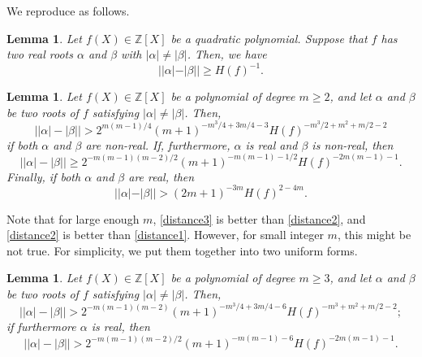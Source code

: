 \documentclass[12pt]{amsart}
\newtheorem{lemma}[theorem]{Lemma}
\theoremstyle{definition}
\theoremstyle{remark}
\numberwithin{equation}{section}
\begin{document}
We reproduce \cite[Lemma 2.4 and Lemma 2.5]{DS2} as follows.

\begin{lemma}
\label{quadratic}
Let $f(X)\in{{\mathbb Z}}[X]$ be a quadratic polynomial. Suppose that $f$ has two real roots ${\alpha}$ and ${\beta}$ with $|{\alpha}| \ne |{\beta}|$. Then, we have
$$
||{\alpha}|-|{\beta}|| \ge H(f)^{-1}.
$$
\end{lemma}

\begin{lemma}
Let $f(X)\in{{\mathbb Z}}[X]$ be a polynomial of degree $m\ge 2$, and let $\alpha$ and $\beta$ be two roots of $f$ satisfying $|\alpha| \ne |\beta|$. Then,
\begin{equation}
\label{distance1}
\left||\alpha|-|\beta|\right|>
2^{m(m-1)/4}(m+1)^{-m^3/4+3m/4-3}H(f)^{-m^3/2+m^2+m/2-2}
\end{equation}
if both ${\alpha}$ and ${\beta}$ are non-real.
If, furthermore, ${\alpha}$ is real and ${\beta}$ is non-real, then
\begin{equation}
\label{distance2}
\left||\alpha|-|\beta|\right| \ge 2^{-m(m-1)(m-2)/2} (m+1)^{-m(m-1)-1/2}H(f)^{-2m(m-1)-1}.
\end{equation}
Finally, if both ${\alpha}$ and ${\beta}$ are real, then
\begin{equation}
\label{distance3}
||\alpha|-|\beta||>(2m+1)^{-3m}H(f)^{2-4m}.
\end{equation}
\end{lemma}

Note that for large enough $m$, \eqref{distance3} is better than \eqref{distance2}, and \eqref{distance2} is better than \eqref{distance1}. However, for small integer $m$, this might be not true. 
 For simplicity, we put them together into two uniform forms.

\begin{lemma}
Let $f(X)\in{{\mathbb Z}}[X]$ be a polynomial of degree $m\ge 3$, and let $\alpha$ and $\beta$ be two roots of $f$ satisfying $|\alpha| \ne |\beta|$. Then,
\begin{equation}
\label{udis1}
\left||\alpha|-|\beta|\right|>
2^{-m(m-1)(m-2)}(m+1)^{-m^3/4+3m/4-6}H(f)^{-m^3+m^2+m/2-2};
\end{equation}
if furthermore ${\alpha}$ is real, then
\begin{equation}
\label{udis2}
\left||\alpha|-|\beta|\right| > 2^{-m(m-1)(m-2)/2} (m+1)^{-m(m-1)-6}H(f)^{-2m(m-1)-1}.
\end{equation}
\end{lemma}
\end{document}
